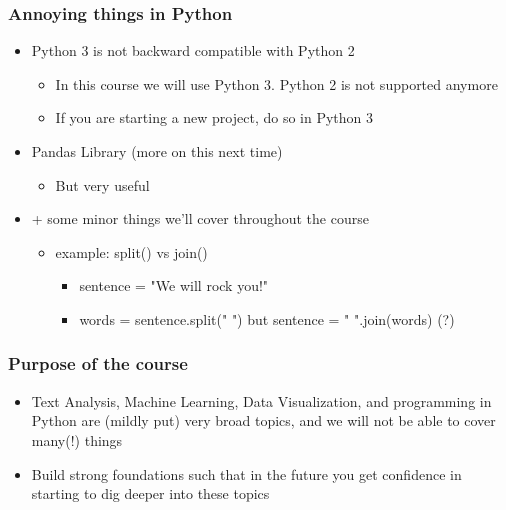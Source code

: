 \documentclass[compress, aspectratio=54]{beamer}
\begin{document}
\begin{frame}
\frametitle{Annoying things in Python}
\begin{itemize}

\item Python 3 is not backward compatible with Python 2
\begin{itemize}
\item In this course we will use Python 3. Python 2 is not supported anymore
\item If you are starting a new project, do so in Python 3
\end{itemize}

\item Pandas Library (more on this next time)
\begin{itemize}
\item But very useful 
\end{itemize}
\item + some minor things we'll cover throughout the course 
\begin{itemize}

\item example: split() vs join()
\begin{itemize}
\item sentence = "We will rock you!"

\item words = sentence.split(" ") but sentence = " ".join(words) (?)
\end{itemize}


\end{itemize}

\end{itemize}

\end{frame}
\begin{frame}
\frametitle{Purpose of the course}
\begin{itemize}

\item Text Analysis, Machine Learning, Data Visualization, and programming in Python are (mildly put) very broad topics, and we will not be able to cover many(!) things
\item Build strong foundations such that in the future you get confidence in starting to dig deeper into these topics
 
\end{itemize}

\end{frame}
\end{document}
